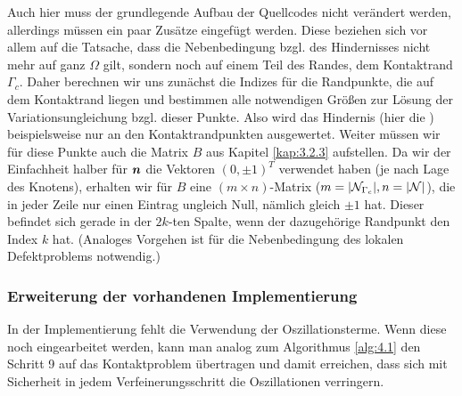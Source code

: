 Auch hier muss der grundlegende Aufbau der Quellcodes nicht verändert werden, allerdings müssen ein paar Zusätze eingefügt werden. Diese beziehen sich vor allem auf die Tatsache, dass die Nebenbedingung bzgl. des Hindernisses nicht mehr auf ganz $\Omega$ gilt, sondern noch auf einem Teil des Randes, dem Kontaktrand $\Gamma_c$. Daher berechnen wir uns zunächst die Indizes für die Randpunkte, die auf dem Kontaktrand liegen und bestimmen alle notwendigen Größen zur Lösung der Variationsungleichung bzgl. dieser Punkte. Also wird das Hindernis (hier die ) beispielsweise nur an den Kontaktrandpunkten ausgewertet. Weiter müssen wir für diese Punkte auch die Matrix $B$ aus Kapitel \ref{kap:3.2.3} aufstellen. Da wir der Einfachheit halber für $\boldsymbol n$ die Vektoren $(0,\pm 1)^T$ verwendet haben (je nach Lage des Knotens), erhalten wir für $B$ eine $(m\times n)$-Matrix ($m = \lvert \mathcal N_{\Gamma_c}\rvert, n = \lvert \mathcal N\rvert$), die in jeder Zeile nur einen Eintrag ungleich Null, nämlich gleich $\pm 1$ hat. Dieser befindet sich gerade in der $2k$-ten Spalte, wenn der dazugehörige Randpunkt den Index $k$ hat. (Analoges Vorgehen ist für die Nebenbedingung des lokalen Defektproblems notwendig.)


\subsubsection{Erweiterung der vorhandenen Implementierung}

In der Implementierung fehlt die Verwendung der Oszillationsterme. Wenn diese noch eingearbeitet werden, kann man analog zum Algorithmus \ref{alg:4.1} den Schritt 9 auf das Kontaktproblem übertragen und damit erreichen, dass sich mit Sicherheit in jedem Verfeinerungsschritt die Oszillationen verringern.



\newpage

